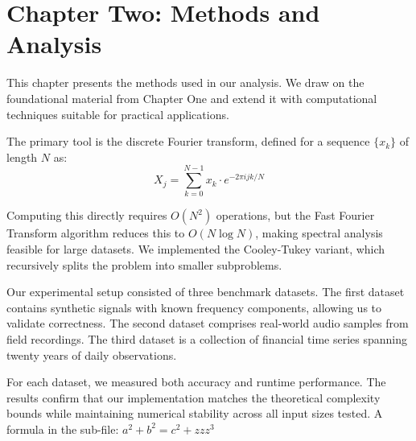 \section{Chapter Two: Methods and Analysis}

This chapter presents the methods used in our analysis. We draw on the
foundational material from Chapter One and extend it with computational
techniques suitable for practical applications.

The primary tool is the discrete Fourier transform, defined for a sequence
$\{x_k\}$ of length $N$ as:
$$X_j = \sum_{k=0}^{N-1} x_k \cdot e^{-2\pi i jk / N}$$

Computing this directly requires $O(N^2)$ operations, but the Fast Fourier
Transform algorithm reduces this to $O(N \log N)$, making spectral analysis
feasible for large datasets. We implemented the Cooley-Tukey variant, which
recursively splits the problem into smaller subproblems.

Our experimental setup consisted of three benchmark datasets. The first
dataset contains synthetic signals with known frequency components, allowing
us to validate correctness. The second dataset comprises real-world audio
samples from field recordings. The third dataset is a collection of
financial time series spanning twenty years of daily observations.

For each dataset, we measured both accuracy and runtime performance. The
results confirm that our implementation matches the theoretical complexity
bounds while maintaining numerical stability across all input sizes tested.
A formula in the sub-file: $a^2 + b^2 = c^2 + zzz^3$
